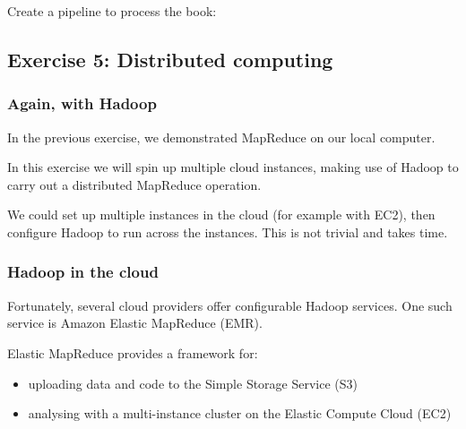 Create a pipeline to process the book:

\begin{Shaded}
\begin{Highlighting}[]
\NormalTok{$ } \KeywordTok{|}  \KeywordTok{|}  \KeywordTok{|}  \KeywordTok{|} 

     
      
     
      
       
       
      
\end{Highlighting}
\end{Shaded}

\subsection{Exercise 5: Distributed
computing}\label{exercise-5-distributed-computing}

\subsubsection{Again, with Hadoop}\label{again-with-hadoop}

In the previous exercise, we demonstrated MapReduce on our local
computer.

In this exercise we will spin up multiple cloud instances, making use of
Hadoop to carry out a distributed MapReduce operation.

We could set up multiple instances in the cloud (for example with EC2),
then configure Hadoop to run across the instances. This is not trivial
and takes time.

\subsubsection{Hadoop in the cloud}\label{hadoop-in-the-cloud}

Fortunately, several cloud providers offer configurable Hadoop services.
One such service is Amazon Elastic MapReduce (EMR).

Elastic MapReduce provides a framework for:

\begin{itemize}
\itemsep1pt\parskip0pt
\item
  uploading data and code to the Simple Storage Service (S3)
\item
  analysing with a multi-instance cluster on the Elastic Compute Cloud
  (EC2)
\end{itemize}

